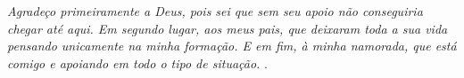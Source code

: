 \begin{agradecimentos}
\textit{Agradeço primeiramente a Deus, pois sei que sem seu apoio não conseguiria
chegar até aqui. Em segundo lugar, aos meus pais, que deixaram toda a sua vida
pensando unicamente na minha formação. E em fim, à minha namorada, que está
comigo e apoiando em todo o tipo de situação. }.
\end{agradecimentos}
